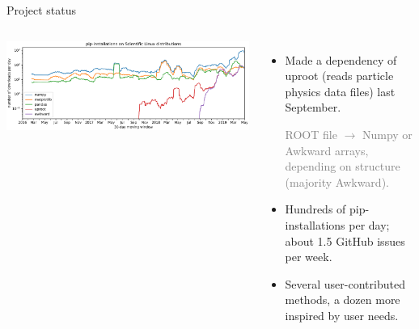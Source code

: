 \documentclass[aspectratio=169]{beamer}
\begin{document}
\begin{frame}{Project status}
\large
\begin{columns}
\begin{center}
\includegraphics[width=0.9\linewidth]{pip-scientificlinux-uproot.pdf}
\end{center}

\vspace{-0.35 cm}
\begin{itemize}
\item Made a dependency of uproot (reads particle physics data files) last September.

\textcolor{gray}{\normalsize ROOT file $\to$ Numpy or Awkward arrays, depending on structure (majority Awkward).}

\item Hundreds of pip-installations per day; about 1.5 GitHub issues per week.
\item Several user-contributed methods, a dozen more inspired by user needs.
\end{itemize}
\end{columns}
\end{frame}

\begin{frame}{}
\large


\end{frame}



\begin{frame}{}
\end{frame}
\end{document}
